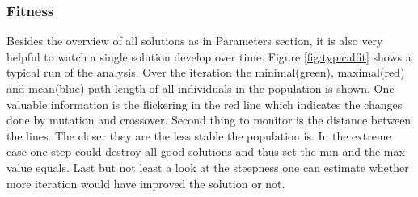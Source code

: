 \documentclass{scrartcl}
\begin{document}
\subsubsection{Fitness}
Besides the overview of all solutions as in Parameters section, it is also very helpful to watch a single solution develop over time. Figure \ref{fig:typicalfit} shows a typical run of the analysis. Over the iteration the minimal(green), maximal(red) and mean(blue) path length of all individuals in the population is shown. One valuable information is the flickering in the red line which indicates the changes done by mutation and crossover. Second thing to monitor is the distance between the lines. The closer they are the less stable the population is. In the extreme case one step could destroy all good solutions and thus set the min and the max value equals. Last but not least a look at the steepness one can estimate whether more iteration would have improved the solution or not.
\end{document}
